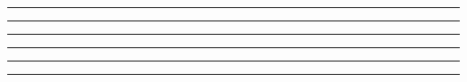 

\nopagenumbers
\topskip 0pt
\parindent 0pt
\parskip 0pt


\null
{}
\vfil\eject


\hrule height 1sp width 1sp depth 0sp
\vfil\eject


{%
\hsize 10in
\vsize 12in
\hoffset -1in
\voffset -1in
\hrule height 1sp      width 8.299in depth 0sp
\hrule height 11.695in width 8.299in depth 0sp
\vfil\eject


\hrule height 1sp      width 8.301in depth 0sp
\hrule height 11.695in width 8.301in depth 0sp
\vfil\eject


\hrule height 11.701in width 8.299in depth 0sp
\vfil\eject

}%

